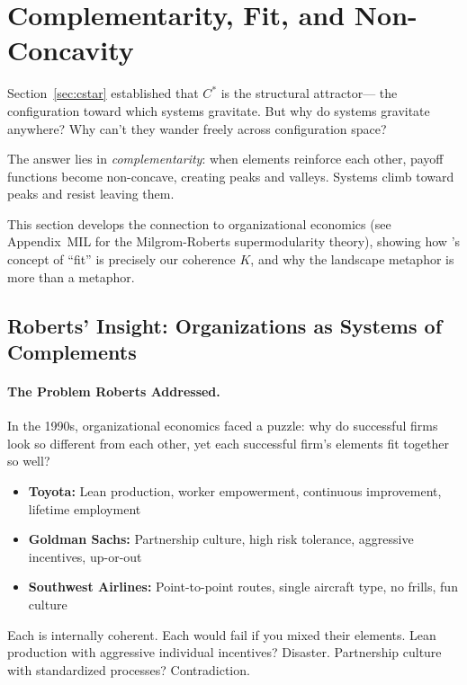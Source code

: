 \section{Complementarity, Fit, and Non-Concavity}
\label{sec:roberts}

Section~\ref{sec:cstar} established that $C^*$ is the structural attractor---
the configuration toward which systems gravitate.
But why do systems gravitate anywhere?
Why can't they wander freely across configuration space?

The answer lies in \emph{complementarity}: when elements reinforce each other,
payoff functions become non-concave, creating peaks and valleys.
Systems climb toward peaks and resist leaving them.

This section develops the connection to organizational economics (see Appendix~MIL for the Milgrom-Roberts supermodularity theory),
showing how \citet{roberts2004}'s concept of ``fit'' is precisely our coherence $K$,
and why the landscape metaphor is more than a metaphor.

\subsection{Roberts' Insight: Organizations as Systems of Complements}

\paragraph{The Problem Roberts Addressed.}
In the 1990s, organizational economics faced a puzzle:
why do successful firms look so different from each other,
yet each successful firm's elements fit together so well?

\begin{itemize}
  \item \textbf{Toyota:} Lean production, worker empowerment, continuous improvement, lifetime employment
  \item \textbf{Goldman Sachs:} Partnership culture, high risk tolerance, aggressive incentives, up-or-out
  \item \textbf{Southwest Airlines:} Point-to-point routes, single aircraft type, no frills, fun culture
\end{itemize}

Each is internally coherent. Each would fail if you mixed their elements.
Lean production with aggressive individual incentives? Disaster.
Partnership culture with standardized processes? Contradiction.


